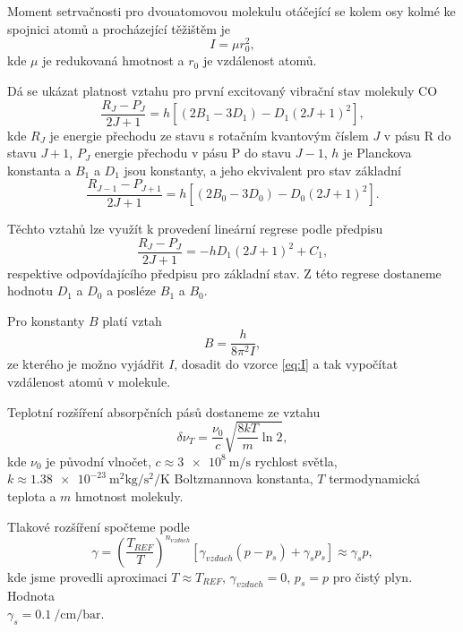 \documentclass{protokol}
\begin{document}
    Moment setrvačnosti pro dvouatomovou molekulu otáčející se kolem osy kolmé ke spojnici atomů a procházející těžištěm je 
    \begin{equation} \label{eq:I} 
      I = \mu r_0^2,
    \end{equation}
    kde $\mu$ je redukovaná hmotnost a $r_0$ je vzdálenost atomů.

    Dá se ukázat platnost vztahu pro první excitovaný vibrační stav molekuly CO
    \begin{equation}
      \frac{R_J - P_J}{2 J + 1} = h \left[  (2B_1 - 3D_1) - D_1(2J + 1)^2  \right],
    \end{equation}
    kde $R_J$ je energie přechodu ze stavu s rotačním kvantovým číslem $J$ v pásu R do stavu $J+1$, $P_J$ energie přechodu v pásu P do stavu $J-1$, $h$ je Planckova konstanta a $B_1$ a $D_1$ jsou konstanty, a jeho ekvivalent pro stav základní 
    \begin{equation}
      \frac{R_{J-1} - P_{J+1}}{2J + 1} = h \left[  (2B_0 - 3D_0) - D_0(2J + 1)^2  \right].
    \end{equation}

    Těchto vztahů lze využít k provedení lineární regrese podle předpisu
    \begin{equation}
      \frac{R_J - P_J}{2 J + 1} = - h D_1 (2J + 1)^2 + C_1,
    \end{equation}
    respektive odpovídajícího předpisu pro základní stav. Z této regrese dostaneme hodnotu $D_1$ a $D_0$ a posléze $B_1$ a $B_0$.
    
    Pro konstanty $B$ platí vztah
    \begin{equation}
      B = \frac{h}{8 \pi^2 I},
    \end{equation}    
    ze kterého je možno vyjádřit $I$, dosadit do vzorce \eqref{eq:I} a tak vypočítat vzdálenost atomů v molekule.

    Teplotní rozšíření absorpčních pásů dostaneme ze vztahu
    \begin{equation}
      \delta \nu_T = \frac{\nu_0}{c} \sqrt{\frac{8kT}{m} \ln 2},
    \end{equation}
    kde $\nu_0$ je původní vlnočet, $c \approx \SI{3 e8}{\metre\per\second}$ rychlost světla, $k \approx \SI{1.38 e-23}{\metre\squared\kilogram\per\second\squared\per\kelvin}$ Boltzmannova konstanta, $T$ termodynamická teplota a $m$ hmotnost molekuly.

    Tlakové rozšíření spočteme podle
    \begin{equation}
      \gamma = \left(  \frac{T_{REF}}{T}  \right)^{n_{vzduch}} \left[  \gamma_{vzduch}(p - p_s) + \gamma_s p_s  \right] \approx \gamma_s p,
    \end{equation}
    kde jsme provedli aproximaci $T \approx T_{REF}$, $\gamma_{vzduch} = 0$, $p_s = p$ pro čistý plyn. Hodnota\\ $\gamma_s = \SI{0.1}{\per\centi\metre\per\bar}$.
\end{document}
